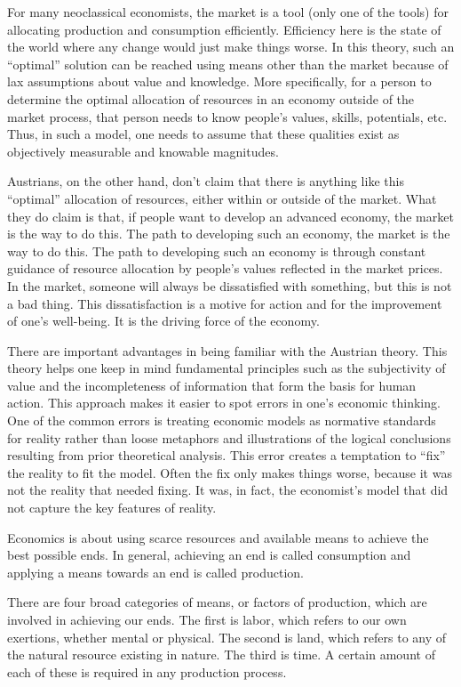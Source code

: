 For many neoclassical economists, the market is a tool (only one of the tools) for allocating production and consumption efficiently. Efficiency here is the state of the world where any change would just make things worse. In this theory, such an “optimal” solution can be reached using means other than the market because of lax assumptions about value and knowledge. More specifically, for a person to determine the optimal allocation of resources in an economy outside of the market process, that person needs to know people’s values, skills, potentials, etc. Thus, in such a model, one needs to assume that these qualities exist as objectively measurable and knowable magnitudes.

Austrians, on the other hand, don’t claim that there is anything like this “optimal” allocation of resources, either within or outside of the market. What they do claim is that, if people want to develop an advanced economy, the market is the way to do this. The path to developing such an economy, the market is the way to do this. The path to developing such an economy is through constant guidance of resource allocation by people’s values reflected in the market prices. In the market, someone will always be dissatisfied with something, but this is not a bad thing. This dissatisfaction is a motive for action and for the improvement of one’s well-being. It is the driving force of the economy.

There are important advantages in being familiar with the Austrian theory. This theory helps one keep in mind fundamental principles such as the subjectivity of value and the incompleteness of information that form the basis for human action. This approach makes it easier to spot errors in one’s economic thinking. One of the common errors is treating economic models as normative standards for reality rather than loose metaphors and illustrations of the logical conclusions resulting from prior theoretical analysis. This error creates a temptation to ``fix'' the reality to fit the model. Often the fix only makes things worse, because it was not the reality that needed fixing. It was, in fact, the economist’s model that did not capture the key features of reality.

Economics is about using scarce resources and available means to achieve the best possible ends. In general, achieving an end is called consumption and applying a means towards an end is called production.

There are four broad categories of means, or factors of production, which are involved in achieving our ends. The first is labor, which refers to our own exertions, whether mental or physical. The second is land, which refers to any of the natural resource existing in nature. The third is time. A certain amount of each of these is required in any production process.

